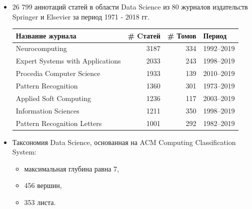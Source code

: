 \documentclass[aspectratio=169]{beamer}
\begin{document}
\begin{frame}
	\frametitle{\insertsection}
	\framesubtitle{\insertsubsection}
	\begin{itemize}
		\item 26 799 аннотаций статей в области Data Science из 80 журналов издательств Springer и Elsevier за период 1971 - 2018 гг.
		
		
		\begin{table}
			\centering
			{\footnotesize
				\begin{tabular}{|l|r|r|l|}
					\hline
					Название журнала                                    &  \# Cтатей     & \# Томов & Период     \\
					\hline
					Neurocomputing                                      &  3187 &  334 &  1992--2019 \\
					Expert Systems with Applications                    &  2033 &  243 &  1998--2019 \\
					Procedia Computer Science                           &  1933 &  139 &  2010--2019 \\
					Pattern Recognition                                 &  1360 &  301 &  1973--2019 \\
					Applied Soft Computing                              &  1236 &  117 &  2003--2019 \\
					Information Sciences                                &  1211 &  350 &  1998--2019 \\
					Pattern Recognition Letters                         &  1001 &  292 &  1982--2019 \\
					\hline
			\end{tabular}}
		\end{table}
	
		\item Таксономия Data Science, основанная на ACM Computing Classification System:
		\begin{itemize}
			\item максимальная глубина равна 7,
			\item 456 вершин,
			\item 353 листа.
		\end{itemize}
	
		
	\end{itemize}
	

\end{frame}
\end{document}
